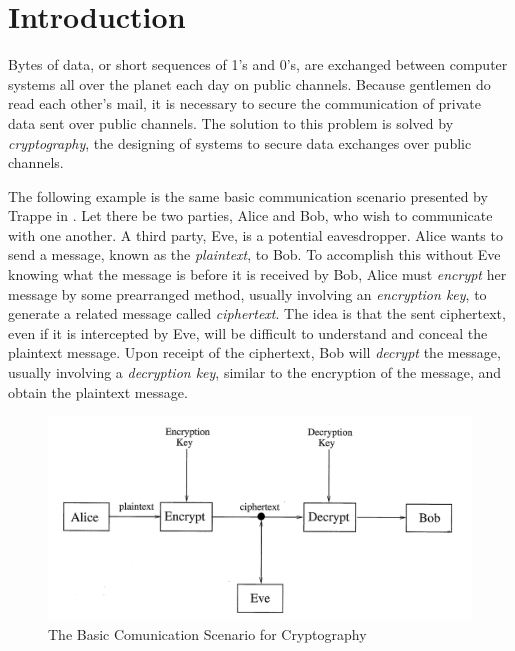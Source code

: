 \section{Introduction}

\par Bytes of data, or short sequences of 1's and 0's, are exchanged between
computer systems all over the planet each day on public channels.
Because gentlemen do read each other's mail, it is necessary to secure the
communication of private data sent over public channels. The solution to this
problem is solved by {\em cryptography}, the designing of systems to secure
data exchanges over public channels.

\par The following example is the same basic communication scenario presented
by Trappe in \cite{trappe-washington_intro-to-crypto}.
Let there be two parties, Alice and Bob, who wish to communicate with one another.
A third party, Eve, is a potential eavesdropper. Alice wants to send a message,
known as the {\em plaintext}, to Bob. To accomplish this without Eve knowing
what the message is before it is received by Bob, Alice must {\em encrypt} her message
by some prearranged method, usually involving an {\em encryption key}, to generate
a related message called {\em ciphertext}. The idea is that the sent ciphertext,
even if it is intercepted by Eve, will be difficult to understand and conceal the
plaintext message. Upon receipt of the ciphertext, Bob will {\em decrypt} the message,
usually involving a {\em decryption key}, similar to the encryption of the message,
and obtain the plaintext message.

\begin{figure}[h!]
	\centering
		\includegraphics[width=120mm]{figs/basic-scenario.png}
		\caption{The Basic Comunication Scenario for Cryptography \cite{trappe-washington_intro-to-crypto}}
\end{figure}

